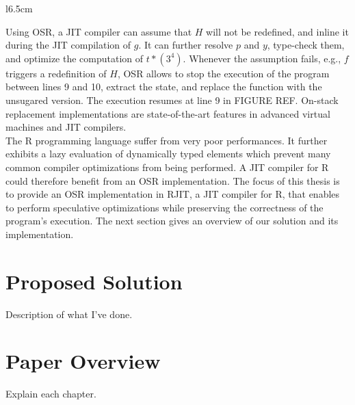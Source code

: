 \begin{wrapfigure}[11]{l}{6.5cm}
\end{wrapfigure}
Using OSR, a JIT compiler can assume that $H$ will not be redefined, and inline it during the JIT compilation of $g$.
It can further resolve $p$ and $y$, type-check them, and optimize the computation of $t * (3 ^ 4)$.
Whenever the assumption fails, e.g., $f$ triggers a redefinition of $H$, OSR allows to stop the execution of the program between lines 9 and 10, extract the state, and replace the function with the unsugared version.
The execution resumes at line 9 in FIGURE REF.
On-stack replacement implementations are state-of-the-art features in advanced virtual machines and JIT compilers.\\


The R programming language suffer from very poor performances. 
It further exhibits a lazy evaluation of dynamically typed elements which prevent many common compiler optimizations from being performed.
A JIT compiler for R could therefore benefit from an OSR implementation.
The focus of this thesis is to provide an OSR implementation in RJIT, a JIT compiler for R, that enables to perform speculative optimizations while preserving the correctness of the program's execution.
The next section gives an overview of our solution and its implementation.\\

\section{Proposed Solution}
Description of what I've done.

\section{Paper Overview}
Explain each chapter.